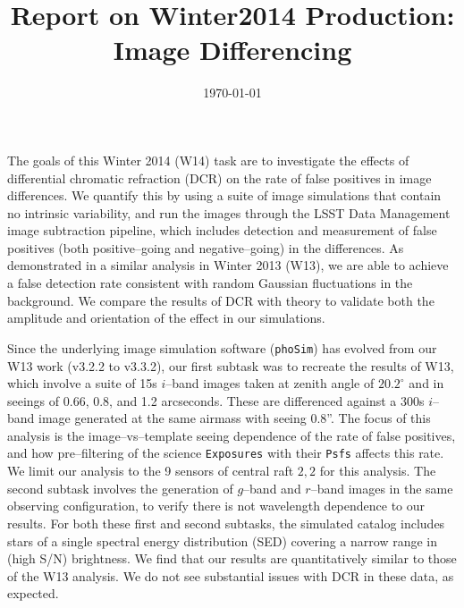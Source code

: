 \documentclass[prd, nofootinbib, floatfix, 11pt, tightenlines, times]{article}
\title{\vspace{-22mm} \Large{Report on Winter2014 Production: Image Differencing} \vspace{-6mm}}
\date{\today}
\begin{document}
\maketitle

The goals of this Winter 2014 (W14) task are to investigate the
effects of differential chromatic refraction (DCR) on the rate of
false positives in image differences.  We quantify this by using a
suite of image simulations that contain no intrinsic variability, and
run the images through the LSST Data Management image subtraction
pipeline, which includes detection and measurement of false positives
(both positive--going and negative--going) in the differences.  As
demonstrated in a similar analysis in Winter 2013 (W13), we are able
to achieve a false detection rate consistent with random Gaussian
fluctuations in the background.  We compare the results of DCR with
theory to validate both the amplitude and orientation of the effect in
our simulations.

Since the underlying image simulation software ({\tt phoSim}) has
evolved from our W13 work (v3.2.2 to v3.3.2), our first subtask was to
recreate the results of W13, which involve a suite of 15s $i$--band
images taken at zenith angle of $20.2^{\circ}$ and in seeings of 0.66,
0.8, and 1.2 arcseconds.  These are differenced against a 300s
$i$--band image generated at the same airmass with seeing 0.8''.  The
focus of this analysis is the image--vs--template seeing dependence of
the rate of false positives, and how pre--filtering of the science
{\tt Exposures} with their {\tt Psfs} affects this rate.  We limit our
analysis to the 9 sensors of central raft $2,2$ for this analysis.
The second subtask involves the generation of $g$--band and $r$--band
images in the same observing configuration, to verify there is not
wavelength dependence to our results.  For both these first and second
subtasks, the simulated catalog includes stars of a single spectral
energy distribution (SED) covering a narrow range in (high S/N)
brightness.  We find that our results are quantitatively similar to
those of the W13 analysis.  We do not see substantial issues with DCR
in these data, as expected.
\end{document}
